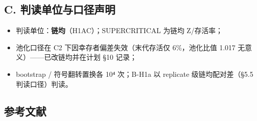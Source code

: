 \documentclass[
]{ctexart}
\providecommand{\tightlist}{%
  \setlength{\itemsep}{0pt}\setlength{\parskip}{0pt}}
\begin{document}
\subsection{C.
判读单位与口径声明}\label{c.-ux5224ux8bfbux5355ux4f4dux4e0eux53e3ux5f84ux58f0ux660e}

\begin{itemize}
\tightlist
\item
  判读单位：\textbf{链均}（H1AC）；SUPERCRITICAL 为链均 Z/存活率；
\item
  池化口径在 C2 下因幸存者偏差失效（末代存活仅 6\%，池化比值 1.017
  无意义）------已改链均并在计划 §10 记录；
\item
  bootstrap / 符号翻转置换各 10⁴ 次；B-H1a 以 replicate
  级链均配对差（§5.5 判读口径）判读。
\end{itemize}

\subsection{参考文献}\label{ux53c2ux8003ux6587ux732e}
\end{document}
